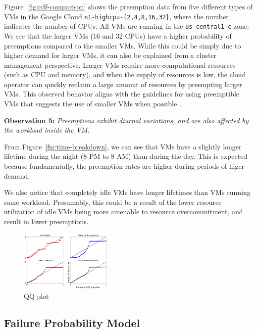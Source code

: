 \noindent Figure~\ref{fig:cdf-comparison} shows the preemption data from five different types of VMs in the Google Cloud \texttt{n1-highcpu-\{2,4,8,16,32\}}, where the number indicates the number of CPUs.
All VMs are running in the \texttt{us-central1-c} zone. 
We see that the larger VMs (16 and 32 CPUs) have a higher probability of preemptions compared to the smaller VMs.
While this could be simply due to higher demand for larger VMs, it can also be explained from a cluster management perspective. 
Larger VMs require more computational resources (such as CPU and memory), and when the supply of resources is low, the cloud operator can quickly reclaim a large amount of resources by preempting larger VMs.
This observed behavior aligns with the guidelines for using preemptible VMs that suggests the use of smaller VMs when possible~\cite{preemptible-documentation}. 

\noindent \textbf{Observation 5:} \emph{Preemptions exhibit diurnal variations, and are also affected by the workload inside the VM.}

\noindent From Figure~\ref{fig:time-breakdown}, we can see that VMs have a slightly longer lifetime during the night (8 PM to 8 AM) than during the day.
This is expected because fundamentally, the preemption rates are higher during periods of higer demand. 

We also notice that completely idle VMs have longer lifetimes than VMs running some workload.
Presumably, this could be a result of the lower resource utilization of idle VMs being more amenable to resource overcommitment, and result in lower preemptions. 

\begin{figure}
  \includegraphics[width=0.4\textwidth]{../graphs/QQ.pdf}
  \caption{QQ plot}
  \label{fig:QQ}
\end{figure}



\vspace*{\subsecspace}
\subsection{Failure Probability Model}
\label{subsec:analytical-model}

